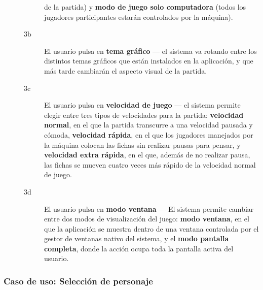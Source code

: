 \begin{description}
\begin{description}
                    de la partida) y \textbf{modo de juego solo computadora} (todos los jugadores participantes
                    estarán controlados por la máquina).
            \item[3b ] El usuario pulsa en \textbf{tema gráfico} --- el sistema va rotando entre los distintos
                    temas gráficos que están instalados en la aplicación, y que más tarde cambiarán el aspecto
                    visual de la partida.
            \item[3c ] El usuario pulsa en \textbf{velocidad de juego} --- el sistema permite elegir entre tres
                    tipos de velocidades para la partida: \textbf{velocidad normal}, en el que la partida
                    transcurre a una velocidad pausada y cómoda, \textbf{velocidad rápida}, en el que los jugadores
                    manejados por la máquina colocan las fichas sin realizar pausas para pensar, y \textbf{velocidad
                    extra rápida}, en el que, además de no realizar pausa, las fichas se mueven cuatro veces
                    más rápido de la velocidad normal de juego.
            \item[3d ] El usuario pulsa en \textbf{modo ventana} --- El sistema permite cambiar entre dos modos
                    de visualización del juego: \textbf{modo ventana}, en el que la aplicación se muestra dentro de
                    una ventana controlada por el gestor de ventanas nativo del sistema, y el \textbf{modo pantalla
                    completa}, donde la acción ocupa toda la pantalla activa del usuario.
        \end{description}
\end{description}

\subsubsection{Caso de uso: Selección de personaje}


